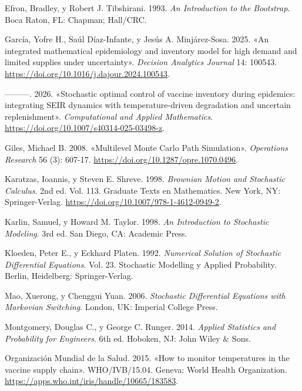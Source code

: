\documentclass[
  spanish,
  us-letterpaper,
]{scrreprt}
\newlength{\cslhangindent}
\newenvironment{CSLReferences}[2] %
 {\begin{list}{}{%
  \setlength{\itemindent}{0pt}
  \setlength{\leftmargin}{0pt}
  \setlength{\parsep}{0pt}
  \ifodd #1
   \setlength{\leftmargin}{\cslhangindent}
   \setlength{\itemindent}{-1\cslhangindent}
  \fi
  \setlength{\itemsep}{#2\baselineskip}}}
 {\end{list}}
\numberwithin{equation}{section}
\theoremstyle{plain}
\theoremstyle{plain}
\theoremstyle{definition}
\theoremstyle{plain}
\theoremstyle{remark}
\begin{document}
\begin{CSLReferences}{1}{0}
Efron, Bradley, y Robert J. Tibshirani. 1993. \emph{An Introduction to
the Bootstrap}. Boca Raton, FL: Chapman; Hall/CRC.

García, Yofre H., Saúl Díaz-Infante, y Jesús A. Minjárez-Sosa. 2025.
{«An integrated mathematical epidemiology and inventory model for high
demand and limited supplies under uncertainty»}. \emph{Decision
Analytics Journal} 14: 100543.
\url{https://doi.org/10.1016/j.dajour.2024.100543}.

---------. 2026. {«Stochastic optimal control of vaccine inventory
during epidemics: integrating {SEIR} dynamics with temperature-driven
degradation and uncertain replenishment»}. \emph{Computational and
Applied Mathematics}. \url{https://doi.org/10.1007/s40314-025-03498-z}.

Giles, Michael B. 2008. {«Multilevel {Monte Carlo} Path Simulation»}.
\emph{Operations Research} 56 (3): 607-17.
\url{https://doi.org/10.1287/opre.1070.0496}.

Karatzas, Ioannis, y Steven E. Shreve. 1998. \emph{Brownian Motion and
Stochastic Calculus}. 2nd ed. Vol. 113. Graduate Texts en Mathematics.
New York, NY: Springer-Verlag.
\url{https://doi.org/10.1007/978-1-4612-0949-2}.

Karlin, Samuel, y Howard M. Taylor. 1998. \emph{An Introduction to
Stochastic Modeling}. 3rd ed. San Diego, CA: Academic Press.

Kloeden, Peter E., y Eckhard Platen. 1992. \emph{Numerical Solution of
Stochastic Differential Equations}. Vol. 23. Stochastic Modelling y
Applied Probability. Berlin, Heidelberg: Springer-Verlag.

Mao, Xuerong, y Chenggui Yuan. 2006. \emph{Stochastic Differential
Equations with Markovian Switching}. London, UK: Imperial College Press.

Montgomery, Douglas C., y George C. Runger. 2014. \emph{Applied
Statistics and Probability for Engineers}. 6th ed. Hoboken, NJ: John
Wiley \& Sons.

Organización Mundial de la Salud. 2015. {«How to monitor temperatures in
the vaccine supply chain»}. WHO/IVB/15.04. Geneva: World Health
Organization. \url{https://apps.who.int/iris/handle/10665/183583}.


\end{CSLReferences}
\end{document}
